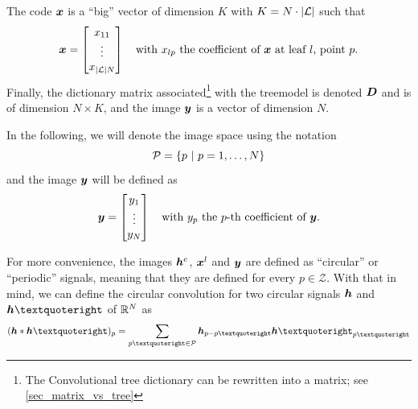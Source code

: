 The code $\x$ is a “big” vector of dimension $K$ with $K = N \cdot |\L|$ such that \begin{equation*}\x = \begin{bmatrix}x_{11} \\ \vdots \\ x_{|\L|N}\end{bmatrix} \quad \text{with $x_{lp}$ the coefficient of $\x$ at leaf $l$, point $p$.}\end{equation*} 
Finally, the dictionary matrix associated\footnote{The Convolutional tree dictionary can be rewritten into a matrix; see \cref{sec_matrix_vs_tree}} with the \gls{treemodel} is denoted $\D$ and is of dimension $N \times K$, and the image $\y$ is a vector of dimension $N$.

\noindent
In the following, we will denote the image space using the notation
\begin{equation*}\P = \{p ~|~ p=1,\dots,N\}\end{equation*}
and the image $\y$ will be defined as
\begin{equation*}\y = \begin{bmatrix}y_1 \\ \vdots \\ y_N\end{bmatrix} \quad \text{with $y_p$ the $p$-th coefficient of $\y$.}
\end{equation*}

\noindent
For more convenience, the images $\h^e$, $\x^l$ and $\y$ are defined as “circular” or “periodic” signals, meaning that they are defined for every $p \in \mathcal{Z}$. With that in mind, we can define the circular convolution for two circular signals $\h$ and $\h’$ of $\R^N$ as
\begin{equation*}(\h * \h’)_p = \sum_{p’ \in \P} \h_{p-p’} \h’_{p’}\end{equation*}

